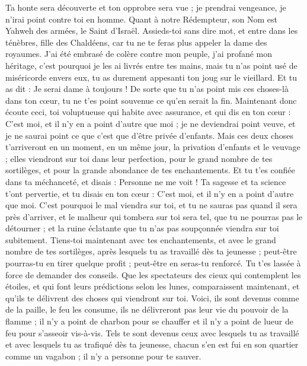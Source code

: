 \begin{multicols}{2}
Ta honte sera découverte et ton opprobre sera vue ; je prendrai vengeance, je n'irai point contre toi en homme.
Quant à notre Rédempteur, son Nom est Yahweh des armées, le Saint d'Israël.
Assieds-toi sans dire mot, et entre dans les ténèbres, fille des Chaldéens, car tu ne te feras plus appeler la dame des royaumes.
J'ai été embrasé de colère contre mon peuple, j'ai profané mon héritage, c'est pourquoi je les ai livrés entre tes mains, mais tu n'as point usé de miséricorde envers eux, tu as durement appesanti ton joug sur le vieillard.
Et tu as dit : Je serai dame à toujours ! De sorte que tu n'as point mis ces choses-là dans ton cœur, tu ne t'es point souvenue ce qu'en serait la fin.
Maintenant donc écoute ceci, toi voluptueuse qui habite avec assurance, et qui dis en ton cœur : C'est moi, et il n'y en a point d'autre que moi ; je ne deviendrai point veuve, et je ne saurai point ce que c'est que d'être privée d'enfants.
Mais ces deux choses t'arriveront en un moment, en un même jour, la privation d'enfants et le veuvage ; elles viendront sur toi dans leur perfection, pour le grand nombre de tes sortilèges, et pour la grande abondance de tes enchantements.
Et tu t'es confiée dans ta méchanceté, et disais : Personne ne me voit ! Ta sagesse et ta science t'ont pervertie, et tu disais en ton cœur : C'est moi, et il n'y en a point d'autre que moi.
 C'est pourquoi le mal viendra sur toi, et tu ne sauras pas quand il sera près d'arriver, et le malheur qui tombera sur toi sera tel, que tu ne pourras pas le détourner ; et la ruine éclatante que tu n'as pas soupçonnée viendra sur toi subitement.
Tiens-toi maintenant avec tes enchantements, et avec le grand nombre de tes sortilèges, après lesquels tu as travaillé dès ta jeunesse ; peut-être pourras-tu en tirer quelque profit ; peut-être en seras-tu renforcé.
Tu t'es lassée à force de demander des conseils. Que les spectateurs des cieux qui contemplent les étoiles, et qui font leurs prédictions selon les lunes, comparaissent maintenant, et qu'ils te délivrent des choses qui viendront sur toi.
Voici, ils sont devenus comme de la paille, le feu les consume, ils ne délivreront pas leur vie du pouvoir de la flamme ; il n'y a point de charbon pour se chauffer et il n'y a point de lueur de feu pour s'asseoir vis-à-vis. 
Tels te sont devenus ceux avec lesquels tu as travaillé et avec lesquels tu as trafiqué dès ta jeunesse, chacun s'en est fui en son quartier comme un vagabon ; il n'y a personne pour te sauver.

\end{multicols}
